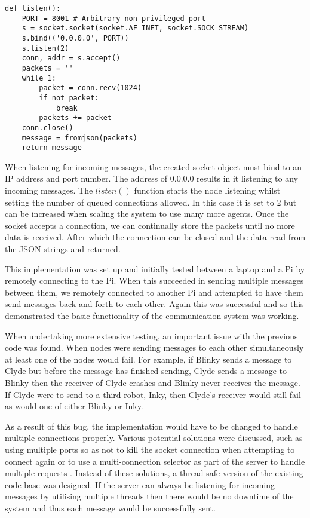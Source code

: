 \begin{lstlisting}
def listen():
    PORT = 8001 # Arbitrary non-privileged port
    s = socket.socket(socket.AF_INET, socket.SOCK_STREAM)
    s.bind(('0.0.0.0', PORT))
    s.listen(2)
    conn, addr = s.accept()
    packets = '' 
    while 1:
        packet = conn.recv(1024)
        if not packet:
            break
        packets += packet
    conn.close()
    message = fromjson(packets)
    return message
\end{lstlisting}
When listening for incoming messages, the created socket object must bind to 
an IP address and port number. The address of 0.0.0.0 results in it listening 
to any incoming messages. The $listen()$ function starts the node listening 
whilst setting the number of queued connections allowed. In this case it is 
set to 2 but can be increased when scaling the system to use many more agents. 
Once the socket  accepts a connection, we can continually store the packets 
until no more data is received. After which the connection can be closed and 
the data read from the JSON strings and returned.

This implementation was set up and initially tested between a laptop and a Pi 
by remotely connecting to the Pi. When this succeeded in sending multiple 
messages between them, we remotely connected to another Pi and attempted to 
have them send messages back and forth to each other. Again this was successful 
and so this demonstrated the basic functionality of the communication system was 
working.

When undertaking more extensive testing, an important issue with the previous 
code was found. When nodes were sending messages to each other simultaneously 
at least one of the nodes would fail. For example, if Blinky sends a message to  
Clyde but before the message has finished sending, Clyde sends a message to 
Blinky then the receiver of Clyde crashes and Blinky never receives the message. 
If Clyde were to send to a third robot, Inky, then Clyde's receiver would still 
fail as would one of either Blinky or Inky. 

As a result of this bug, the implementation would have to be changed to handle 
multiple connections properly. Various potential solutions were discussed, 
such as using multiple ports so as not to kill the socket connection when 
attempting to connect again or to use a multi-connection selector as part of 
the server to handle multiple requests \cite{multiconnectionServer}. Instead 
of these solutions, a thread-safe version of the existing code base was 
designed.  If the server can always be listening for incoming messages by 
utilising multiple threads then there would be no downtime of the system and 
thus each message would be successfully sent. 

